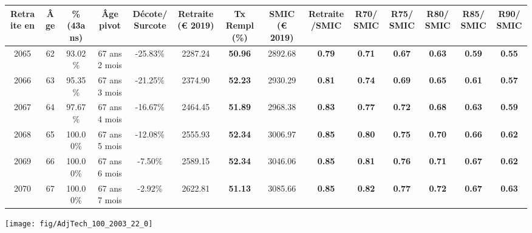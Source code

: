 \begin{adjustbox}{max width=\textwidth} 
\begin{tabular}[htb]{|c|c||c|c|c||c|c||c|c||c|c|c|c|c|} 
\hline 
 Retraite en &  Âge &  \%(43ans) &  Âge pivot &  Décote/Surcote &  Retraite (\euro{} 2019) &  Tx Rempl(\%) &  SMIC (\euro{} 2019) &  Retraite/SMIC &  R70/SMIC &  R75/SMIC &  R80/SMIC &  R85/SMIC &  R90/SMIC \\ 
\hline \hline 
 2065 &  62 &  93.02\% &  67 ans 2 mois &  -25.83\% &  2287.24 &  {\bf 50.96} &  2892.68 &  {\bf {\color{red} 0.79}} &  {\bf {\color{red} 0.71}} &  {\bf {\color{red} 0.67}} &  {\bf {\color{red} 0.63}} &  {\bf {\color{red} 0.59}} &  {\bf {\color{red} 0.55}} \\ 
\hline 
 2066 &  63 &  95.35\% &  67 ans 3 mois &  -21.25\% &  2374.90 &  {\bf 52.23} &  2930.29 &  {\bf {\color{red} 0.81}} &  {\bf {\color{red} 0.74}} &  {\bf {\color{red} 0.69}} &  {\bf {\color{red} 0.65}} &  {\bf {\color{red} 0.61}} &  {\bf {\color{red} 0.57}} \\ 
\hline 
 2067 &  64 &  97.67\% &  67 ans 4 mois &  -16.67\% &  2464.45 &  {\bf 51.89} &  2968.38 &  {\bf {\color{red} 0.83}} &  {\bf {\color{red} 0.77}} &  {\bf {\color{red} 0.72}} &  {\bf {\color{red} 0.68}} &  {\bf {\color{red} 0.63}} &  {\bf {\color{red} 0.59}} \\ 
\hline 
 2068 &  65 &  100.00\% &  67 ans 5 mois &  -12.08\% &  2555.93 &  {\bf 52.34} &  3006.97 &  {\bf {\color{red} 0.85}} &  {\bf {\color{red} 0.80}} &  {\bf {\color{red} 0.75}} &  {\bf {\color{red} 0.70}} &  {\bf {\color{red} 0.66}} &  {\bf {\color{red} 0.62}} \\ 
\hline 
 2069 &  66 &  100.00\% &  67 ans 6 mois &  -7.50\% &  2589.15 &  {\bf 52.34} &  3046.06 &  {\bf {\color{red} 0.85}} &  {\bf {\color{red} 0.81}} &  {\bf {\color{red} 0.76}} &  {\bf {\color{red} 0.71}} &  {\bf {\color{red} 0.67}} &  {\bf {\color{red} 0.62}} \\ 
\hline 
 2070 &  67 &  100.00\% &  67 ans 7 mois &  -2.92\% &  2622.81 &  {\bf 51.13} &  3085.66 &  {\bf {\color{red} 0.85}} &  {\bf {\color{red} 0.82}} &  {\bf {\color{red} 0.77}} &  {\bf {\color{red} 0.72}} &  {\bf {\color{red} 0.67}} &  {\bf {\color{red} 0.63}} \\ 
\hline 
\hline 
\end{tabular} 
\end{adjustbox} 
 
 \vspace{0.1cm} 

 {\hspace{-2.2cm}\texttt{[image: fig/AdjTech\_100\_2003\_22\_0]}} 

